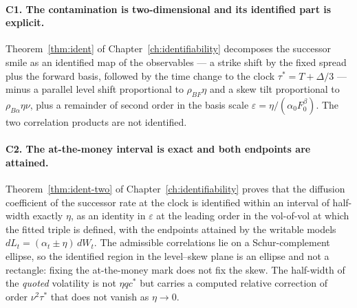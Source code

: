 \documentclass[../../../main.tex]{subfiles}
\begin{document}
\paragraph{C1. The contamination is two-dimensional and its identified part is explicit.} Theorem~\ref{thm:ident} of Chapter~\ref{ch:identifiability} decomposes the successor smile as an identified map of the observables --- a strike shift by the fixed spread plus the forward basis, followed by the time change to the clock $\tau^*=T+\Delta/3$ --- minus a parallel level shift proportional to $\rho_{BF}\eta$ and a skew tilt proportional to $\rho_{B\alpha}\eta\nu$, plus a remainder of second order in the basis scale $\varepsilon=\eta/(\alpha_0F_0^\beta)$. The two correlation products are not identified.


\paragraph{C2. The at-the-money interval is exact and both endpoints are attained.} Theorem~\ref{thm:ident-two} of Chapter~\ref{ch:identifiability} proves that the diffusion coefficient of the successor rate at the clock is identified within an interval of half-width exactly $\eta$, as an identity in $\varepsilon$ at the leading order in the vol-of-vol at which the fitted triple is defined, with the endpoints attained by the writable models $dL_t=(\alpha_t\pm\eta)\,dW_t$. The admissible correlations lie on a Schur-complement ellipse, so the identified region in the level--skew plane is an ellipse and not a rectangle: fixing the at-the-money mark does not fix the skew. The half-width of the \emph{quoted} volatility is not $\eta qc^*$ but carries a computed relative correction of order $\nu^2\tau^*$ that does not vanish as $\eta\to0$.
\end{document}

